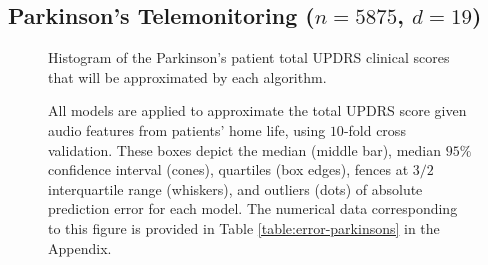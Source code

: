 \documentclass[smallextended,final]{svjour3}  %
\begin{document}
\subsection{Parkinson's Telemonitoring ($n = 5875$, $d = 19$)}

\begin{figure}
  \centering
  \caption{Histogram of the Parkinson's patient total UPDRS clinical
    scores that will be approximated by each algorithm.}
  \label{fig:hist-parkinsons}
\end{figure}

\begin{figure}
  \centering
  \caption{All models are applied to approximate the total UPDRS score
    given audio features from patients' home life, using $10$-fold
    cross validation. These boxes depict the median (middle bar),
    median $95\%$ confidence interval (cones), quartiles (box edges),
    fences at $3/2$ interquartile range (whiskers), and outliers
    (dots) of absolute prediction error for each model. The numerical
    data corresponding to this figure is provided in Table
    \ref{table:error-parkinsons} in the Appendix.}
  \label{fig:error-parkinsons}
\end{figure}
\end{document}
